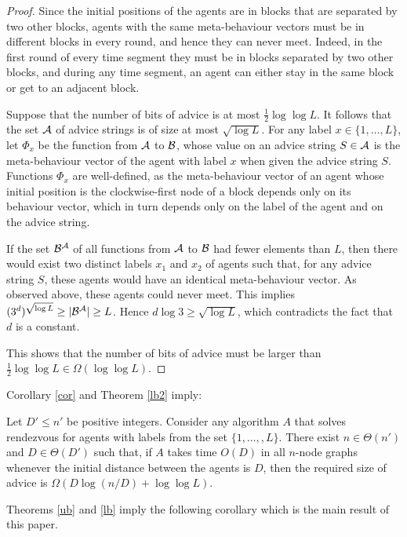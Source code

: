 \documentclass{llncs}
\begin{document}
\begin{proof}
Since the initial positions of the agents are in blocks that are separated by two other blocks, agents with the same
meta-behaviour vectors must be in different blocks in every round, and hence they can never meet. Indeed, in the first round of every time segment they must be in blocks separated by two other blocks, and during any time segment, an agent can either stay in the same block or get to an adjacent block.

Suppose that the number of bits of advice is at most
$\frac{1}{2}\log\log L$. It follows that the set $\cal A$ of advice strings is of size at most $\sqrt{\log L}$. For any label $x \in \{1,\ldots,L\}$, let 
$\Phi _x$ be the function from $\cal A$ to $\cal B$, whose value on an advice string $S \in \cal A$ is the meta-behaviour vector of the agent with label $x$ when given the advice string $S$. Functions $\Phi _x$ are well-defined, as the meta-behaviour vector of an agent whose initial position is the clockwise-first node of a block depends only on its behaviour vector, which in turn depends only on the label of the agent and on the advice string.

 If the set ${ \cal B}^{ \cal A}$ of all functions from ${\cal A}$ to ${ \cal B}$ had fewer elements than $L$, then there would exist two distinct labels $x_1$ and $x_2$ of agents
 such that, for any advice string $S$, these agents would have an identical meta-behaviour vector. As observed above, these agents could never meet. This implies
 $(3^d)^{\sqrt{\log L}}\geq |{ \cal B}^{ \cal A}|\geq L$. Hence $d \log 3 \geq \sqrt{\log L}$, which contradicts the fact that $d$ is a constant.
 
 This shows that the number of bits of advice must be larger than $\frac{1}{2}\log\log L \in \Omega(\log\log L)$.
\end{proof}

Corollary \ref{cor} and  Theorem \ref{lb2} imply:

\begin{theorem}\label{lb}
Let $D' \leq n'$ be positive integers.
Consider any algorithm $A$ that solves rendezvous for agents with labels from the set $\{1,\dots, ,L\}$. 
There exist $n \in \Theta(n')$ and $D \in \Theta(D')$ such that, if $A$ takes time $O(D)$ in all $n$-node graphs
whenever the initial distance between the agents is $D$, then the required size of advice is
$\Omega(D\log (n/D)+\log\log L)$.
\end{theorem}

Theorems \ref{ub} and \ref{lb} imply the following corollary which is the main result of this paper.
\end{document}
